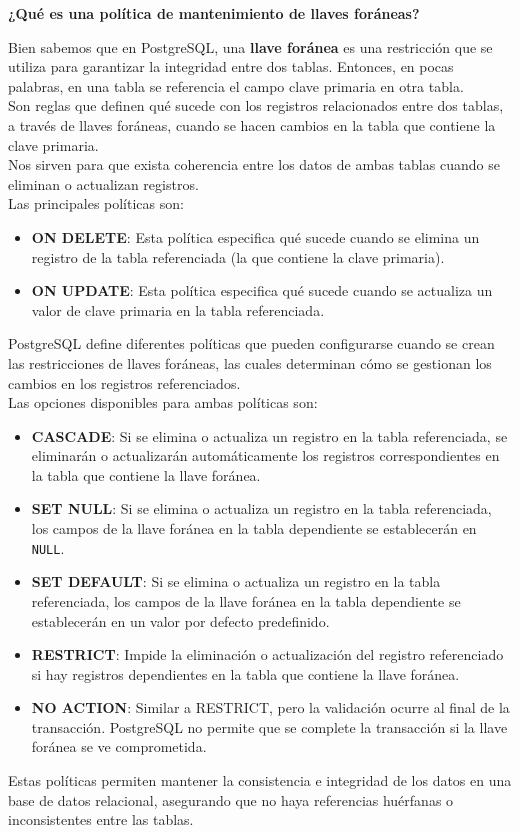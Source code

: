 \begin{center}
    \textbf{¿Qué es una política de mantenimiento de llaves foráneas?}   
\end{center}

Bien sabemos que en PostgreSQL, una \textbf{llave foránea} es una restricción que se utiliza para garantizar la integridad entre dos tablas. Entonces, en pocas palabras, en una tabla se referencia el campo clave primaria en otra tabla. \\

Son reglas que definen qué sucede con los registros relacionados entre dos tablas, a través de llaves foráneas, cuando se hacen cambios en la tabla que contiene la clave primaria. \\

Nos sirven para que exista coherencia entre los datos de ambas tablas cuando se eliminan o actualizan registros. \\

Las principales políticas son:

\begin{itemize}
    \item \textbf{ON DELETE}: Esta política especifica qué sucede cuando se elimina un registro de la tabla referenciada (la que contiene la clave primaria).
    \item \textbf{ON UPDATE}: Esta política especifica qué sucede cuando se actualiza un valor de clave primaria en la tabla referenciada.
\end{itemize}

PostgreSQL define diferentes políticas que pueden configurarse cuando
se crean las restricciones de llaves foráneas, las cuales determinan
cómo se gestionan los cambios en los registros referenciados. \\

Las opciones disponibles para ambas políticas son:

\begin{itemize}
    \item \textbf{CASCADE}: Si se elimina o actualiza un registro en la tabla referenciada, se eliminarán o actualizarán automáticamente los registros correspondientes en la tabla que contiene la llave foránea.
    \item \textbf{SET NULL}: Si se elimina o actualiza un registro en la tabla referenciada, los campos de la llave foránea en la tabla dependiente se establecerán en \texttt{NULL}.
    \item \textbf{SET DEFAULT}: Si se elimina o actualiza un registro en la tabla referenciada, los campos de la llave foránea en la tabla dependiente se establecerán en un valor por defecto predefinido.
    \item \textbf{RESTRICT}: Impide la eliminación o actualización del registro referenciado si hay registros dependientes en la tabla que contiene la llave foránea.
    \item \textbf{NO ACTION}: Similar a RESTRICT, pero la validación ocurre al final de la transacción. PostgreSQL no permite que se complete la transacción si la llave foránea se ve comprometida.
\end{itemize}

Estas políticas permiten mantener la consistencia e integridad de los datos en una base de datos relacional, asegurando que no haya referencias huérfanas o inconsistentes entre las tablas. \\
